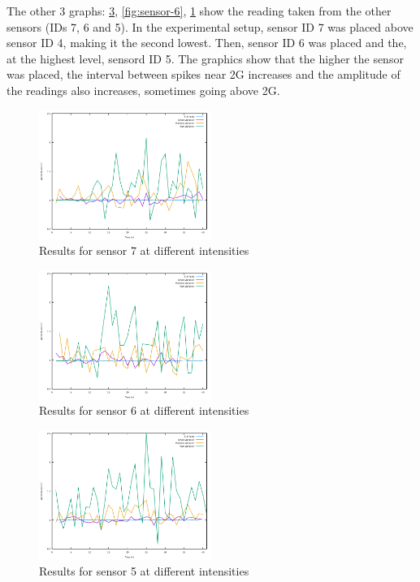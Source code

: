 The other 3 graphs: \ref{fig:sensor-5}, \ref{fig:sensor-6}, \ref{fig:sensor-7} show the reading taken from the other sensors (IDs 7, 6 and 5). In the experimental setup, sensor ID 7 was placed above sensor ID 4, making it 
the second lowest. Then, sensor ID 6 was placed and the, at the highest level, sensord ID 5. The graphics show that the higher the sensor was placed, the interval between spikes near 2G increases and the 
amplitude of the readings also increases, sometimes going above 2G.

\begin{figure}[ht] \centering
  \includegraphics[width=0.5\textwidth]{img/sensor-7-data}
  \caption{Results for sensor 7 at different intensities}
  \label{fig:sensor-7}
\end{figure}

\begin{figure}[ht] \centering
  \includegraphics[width=0.5\textwidth]{img/sensor-6-data}
  \caption{Results for sensor 6 at different intensities}
  \label{fig:sensor-5}
\end{figure}

\begin{figure}[ht] \centering
  \includegraphics[width=0.5\textwidth]{img/sensor-5-data}
  \caption{Results for sensor 5 at different intensities}
  \label{fig:sensor-5}
\end{figure}

